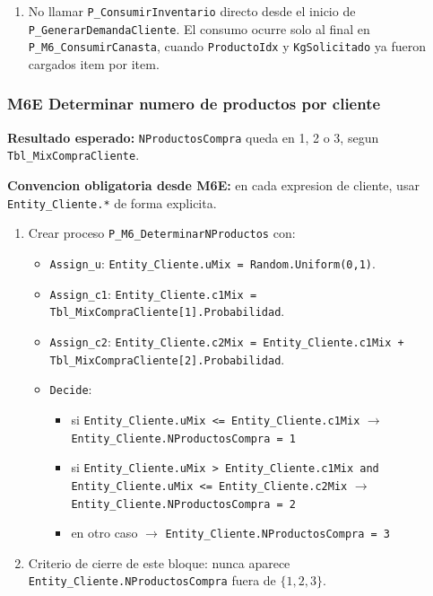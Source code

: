\documentclass[11pt]{article}
\newcommand{\simio}[1]{\texttt{#1}}
\newcommand{\tabla}[1]{\texttt{#1}}
\newcommand{\state}[1]{\texttt{#1}}
\newcommand{\proc}[1]{\texttt{#1}}
\begin{document}
\begin{enumerate}
\begin{enumerate}
    \item \simio{Execute\_GenerarKgCanasta}: llamar \proc{P\_M6\_GenerarKgCanasta}.
    \item \simio{Execute\_ConsumirCanasta}: llamar \proc{P\_M6\_ConsumirCanasta}.
    \item Salir a \simio{Sink\_Clientes}.
  \end{enumerate}
  \item No llamar \proc{P\_ConsumirInventario} directo desde el inicio de \proc{P\_GenerarDemandaCliente}. El consumo ocurre solo al final en \proc{P\_M6\_ConsumirCanasta}, cuando \state{ProductoIdx} y \state{KgSolicitado} ya fueron cargados item por item.
\end{enumerate}

\subsubsection{M6E Determinar numero de productos por cliente}
\textbf{Resultado esperado:} \state{NProductosCompra} queda en 1, 2 o 3, segun \tabla{Tbl\_MixCompraCliente}.

\textbf{Convencion obligatoria desde M6E:} en cada expresion de cliente, usar \state{Entity\_Cliente.*} de forma explicita.

\begin{enumerate}
  \item Crear proceso \proc{P\_M6\_DeterminarNProductos} con:
  \begin{itemize}
    \item \simio{Assign\_u}: \state{Entity\_Cliente.uMix = Random.Uniform(0,1)}.
    \item \simio{Assign\_c1}: \state{Entity\_Cliente.c1Mix = Tbl\_MixCompraCliente[1].Probabilidad}.
    \item \simio{Assign\_c2}: \state{Entity\_Cliente.c2Mix = Entity\_Cliente.c1Mix + Tbl\_MixCompraCliente[2].Probabilidad}.
    \item \simio{Decide}:
    \begin{itemize}
      \item si \state{Entity\_Cliente.uMix <= Entity\_Cliente.c1Mix} \(\rightarrow\) \state{Entity\_Cliente.NProductosCompra = 1}
      \item si \state{Entity\_Cliente.uMix > Entity\_Cliente.c1Mix and Entity\_Cliente.uMix <= Entity\_Cliente.c2Mix} \(\rightarrow\) \state{Entity\_Cliente.NProductosCompra = 2}
      \item en otro caso \(\rightarrow\) \state{Entity\_Cliente.NProductosCompra = 3}
    \end{itemize}
  \end{itemize}
  \item Criterio de cierre de este bloque: nunca aparece \state{Entity\_Cliente.NProductosCompra} fuera de \(\{1,2,3\}\).
\end{enumerate}
\end{document}
